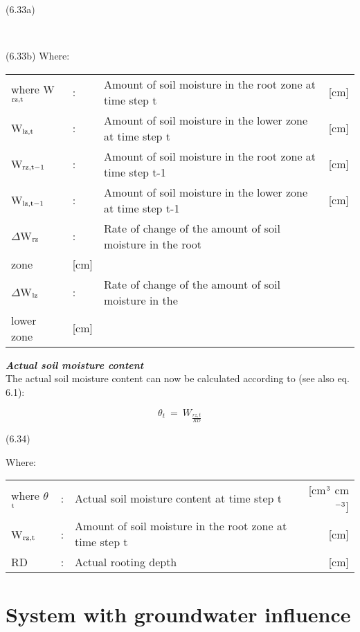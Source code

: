  
\strut\hfill (6.33a)\\
\strut\hfill \\
\strut\hfill (6.33b)
Where:\\
\begin{tabularx}{\textwidth}{llXr}



where W$_{{\rm rz,t}}$ &:& Amount of soil moisture in the root zone at time step t  & [cm]\\
W$_{{\rm lz,t}}$ &:& Amount of soil moisture in the lower zone at time step t  & [cm]\\
W$_{{\rm rz,t-1}}$ &:& Amount of soil moisture in the root zone at time step t-1  & [cm]\\
W$_{{\rm lz,t-1}}$ &:& Amount of soil moisture in the lower zone at time step t-1  & [cm]\\
$\Delta$W$_{{\rm rz}}$ &:& Rate of change of the amount of soil moisture in the root \\
   zone  & [cm]\\
$\Delta$W$_{{\rm lz}}$ &:& Rate of change of the amount of soil moisture in the \\
   lower zone  & [cm]
\end{tabularx}


{\it {\bf Actual soil moisture content}\/}\\
The actual soil moisture content can now be calculated according to (see also eq. 6.1):

\begin{equation}
\theta _{t} ~=~ W _{\frac{rz, t}{RD}} 
\end{equation}

 
\strut\hfill (6.34)\\
\strut\hfill 
Where:\\
\begin{tabularx}{\textwidth}{llXr}



where $\theta$$_{{\rm t}}$ &:& Actual soil moisture content at time step t  & [cm$^{{\rm 3}}$ cm$^{{\rm -3}}$]\\
W$_{{\rm rz,t}}$ &:& Amount of soil moisture in the root zone at time step t  & [cm]\\
RD &:& Actual rooting depth  & [cm]
\end{tabularx}






\newpage
\section{System with groundwater influence  }

